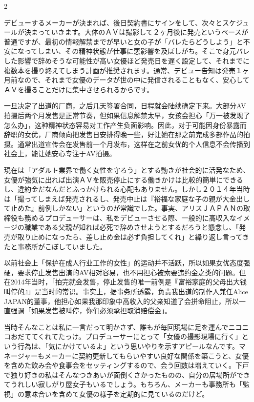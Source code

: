 \documentclass[12pt,UTF8]{ctexbook}
\begin{document}
\begin{paracol}{2}

デビューするメーカーが決まれば、後日契約書にサインをして、次々とスケジュールが決まっていきます。大体のＡＶは撮影して２ヶ月後に発売というペースが普通ですが、最初の情報解禁までが早いと女の子が「バレたらどうしよう」と不安になってしまい、その精神状態が仕事に悪影響を及ぼしがち。そこで身元バレした影響で辞めそうな可能性が高い女優ほど発売日を遅く設定して、それまでに複数本を撮り終えてしまう計画が推奨されます。通常、デビュー告知は発売１ヶ月前なので、それまで女優のデータが世の中に発信されることもなく、安心してＡＶを撮ることだけに集中させられるからです。

\switchcolumn

一旦决定了出道的厂商，之后几天签署合同，日程就会陆续确定下来。大部分AV拍摄后两个月发售是正常节奏，但如果信息解禁太早，女孩会担心「万一被发现了怎么办」，这种精神状态容易对工作产生负面影响。因此，对于可能因身份暴露而辞职的女优，厂商倾向把发售日安排得晚一些，好让她在那之前完成多部作品的拍摄。通常出道宣传会在发售前一个月发布，这样在之前女优的个人信息不会传播到社会上，能让她安心专注于AV拍摄。

\switchcolumn*

現在は「アダルト業界で働く女性を守ろう」とする動きが社会的に活発なため、女優が強気に出れば出演ＡＶを販売停止にする働きかけは比較的簡単にできるし、違約金だなんだとふっかけられる心配もありません。しかし２０１４年当時は「撮ってしまえば発売されるし、発売中止は『裕福な家庭な子の親が大金出して止めた』前例しかない」というのが常識でした。事実、アリスＪＡＰＡＮの取締役も務めるプロデューサーは、私をデビューさせる際、一般的に高収入なイメージの職業である父親が知れば必死で辞めさせようとするだろうと懸念し、「発売が取り止めになったら、差し止め金は必ず負担してくれ」と繰り返し言ってきたと事務所がこぼしていました。

\switchcolumn

以前社会上「保护在成人行业工作的女性」的运动并不活跃，所以如果女优态度强硬，要求停止发售出演的AV相对容易，也不用担心被索要违约金之类的问题。但在2014年当时，「拍完就会发售，停止发售的唯一前例是『富裕家庭的父母出大钱叫停的』」是当时的常识。事实上，据事务所透露，负责我出道的制作人兼任Alice JAPAN的董事，他担心如果我那印象中高收入的父亲知道了会拼命阻止，所以一直强调「如果发售被叫停，你们必须承担取消赔偿金」。

\switchcolumn*

当時そんなことは私に一言だって明かさず、誰もが毎回現場に足を運んでニコニコおだててくれてたっけ。プロデューサーにとって「女優の撮影現場に行く」という行為は、「気にかけているよ」という思いやりを示すアピールなんです。マネージャーもメーカーに契約更新してもらいやすい良好な関係を築こうと、女優を含めた飲み会や食事会をセッティングするので、会う回数は増えていく。下戸で独り好きの私はそんなつきあいが面倒くさかったものの、自分の居場所ができてうれしい寂しがり屋女子もいるでしょう。もちろん、メーカーも事務所も「監視」の意味合いを含めて女優の様子を定期的に見ているのだけど。


\end{paracol}
\end{document}

